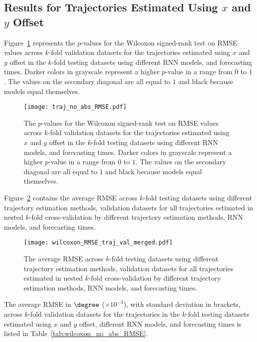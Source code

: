 \subsection{Results for Trajectories Estimated Using $x$ and $y$ Offset}

Figure~\ref{fig:traj_no_abs_RMSE} represents the $p$-values for the Wilcoxon signed-rank test on RMSE values across $k$-fold validation datasets for the trajectories estimated using $x$ and $y$ offset in the $k$-fold testing datasets using different RNN models, and forecasting times. Darker colors in grayscale represent a higher $p$-value in a range from $0$ to $1$. The values on the secondary diagonal are all equal to $1$ and black because models equal themselves.

\begin{figure}[!ht]
	\centering
	\texttt{[image: traj\_no\_abs\_RMSE.pdf]}
	\caption{The $p$-values for the Wilcoxon signed-rank test on RMSE values across $k$-fold validation datasets for the trajectories estimated using $x$ and $y$ offset in the $k$-fold testing datasets using different RNN models, and forecasting times. Darker colors in grayscale represent a higher $p$-value in a range from $0$ to $1$. The values on the secondary diagonal are all equal to $1$ and black because models equal themselves.}
	\label{fig:traj_no_abs_RMSE}
\end{figure}

Figure~\ref{fig:wilcoxon_RMSE_traj_val_merged} contains the average RMSE across $k$-fold testing datasets using different trajectory estimation methods, validation datasets for all trajectories estimated in nested $k$-fold cross-validation by different trajectory estimation methods, RNN models, and forecasting times.

\begin{figure}[!ht]
	\centering
	\texttt{[image: wilcoxon\_RMSE\_traj\_val\_merged.pdf]}
	\caption{The average RMSE across $k$-fold testing datasets using different trajectory estimation methods, validation datasets for all trajectories estimated in nested $k$-fold cross-validation by different trajectory estimation methods, RNN models, and forecasting times.}
	\label{fig:wilcoxon_RMSE_traj_val_merged}
\end{figure}

The average RMSE in $\degree$ ($\times 10^{-3}$), with standard deviation in brackets, across $k$-fold validation datasets for the trajectories in the $k$-fold testing datasets estimated using $x$ and $y$ offset, different RNN models, and forecasting times is listed in Table~\ref{tab:wilcoxon_no_abs_RMSE}.


